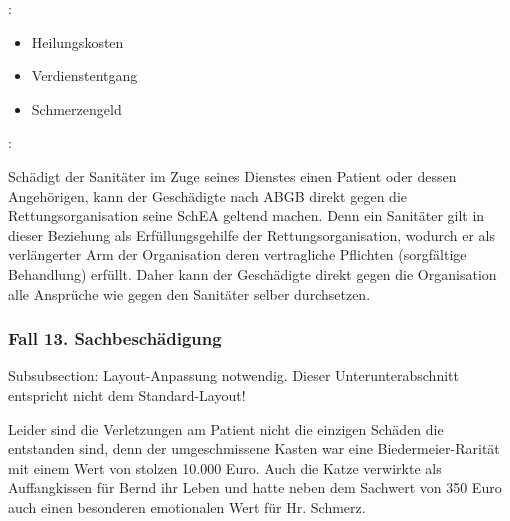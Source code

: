 :

\begin{itemize}
	\item {\mdseries
	Heilungskosten}
	\item {\mdseries
	Verdienstentgang}
	\item {\mdseries
	Schmerzengeld}
\end{itemize}


:

Schädigt der Sanitäter im Zuge seines Dienstes einen Patient oder
dessen Angeh\"origen, kann der Geschädigte nach
 ABGB direkt gegen die
Rettungsorganisation seine SchEA geltend machen. Denn ein Sanitäter
gilt in dieser Beziehung als Erf\"ullungsgehilfe der
Rettungsorganisation, wodurch er als verlängerter Arm der
Organisation deren vertragliche Pflichten (sorgfältige Behandlung)
erf\"ullt. Daher kann der Geschädigte direkt gegen die Organisation
alle Anspr\"uche wie gegen den Sanitäter selber durchsetzen.




\subsubsection{Fall 13. Sachbeschädigung}
\begin{anfxwarning}[author=GABS]{Subsubsection: Layout-Anpassung notwendig.}
Dieser Unterunterabschnitt entspricht nicht dem Standard-Layout!
\end{anfxwarning}


Leider sind die Verletzungen am Patient nicht die einzigen Schäden die
entstanden sind, denn der umgeschmissene Kasten war eine
Biedermeier-Rarität mit einem Wert von stolzen 10.000 Euro. Auch die
Katze verwirkte als Auffangkissen f\"ur Bernd ihr Leben und hatte neben
dem Sachwert von 350 Euro auch einen besonderen emotionalen Wert f\"ur
Hr. Schmerz.

